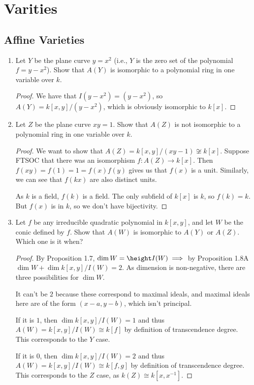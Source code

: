 \section{Varities}

\subsection{Affine Varieties}

\begin{exercise}%
\begin{enumerate}
\item Let $Y $ be the plane curve $y = x^2 $ (i.e., $Y $ is the zero set of the polynomial $f = y - x^2 $). Show that $A(Y) $ is isomorphic to a polynomial ring in one variable over $k $.
\begin{proof}
	We have that $I(y-x^2) = (y-x^2) $, so $A(Y) = k[x,y] / (y-x^2) $, which is obviously isomorphic to $k[x] $.
\end{proof}
\item Let $Z $ be the plane curve $xy = 1 $. Show that $A(Z) $ is not isomorphic to a polynomial ring in one variable over $k $.
\begin{proof}
	We want to show that $A(Z) = k[x,y] / (xy-1) \not\cong k[x] $.
	Suppose FTSOC that there was an isomorphism $f: A(Z) \to k[x]$.
	Then $f(xy) = f(1) = 1 = f(x)f(y) $ gives us that $f(x) $ is a unit.
	Similarly, we can see that $f(kx) $ are also distinct units.

	As $k $ is a field, $f(k) $ is a field.
	The only subfield of $k[x] $ is $k $, so $f(k) = k $.
	But $f(x) $ is in $k $, so we don't have bijectivity.
\end{proof}
\item Let $f $ be any irreducible quadratic polynomial in $k[x,y] $, and let $W $ be the conic defined by $f $. Show that $A(W) $ is isomorphic to $A(Y) $ or $A(Z) $. Which one is it when?
\begin{proof}
	By Proposition 1.7, $\dim W = \height I(W) \implies $ by Proposition 1.8A $\dim W + \dim k[x,y] / I(W) = 2 $.
	As dimension is non-negative, there are three possibilities for $\dim W $.

	It can't be $2 $ because these correspond to maximal ideals, and maximal ideals here are of the form $(x-a,y-b) $, which isn't principal.

	If it is $1 $, then $\dim k[x,y] / I(W) = 1 $ and thus $A(W) = k[x,y] / I(W) \cong k[f] $ by definition of transcendence degree.
	This corresponds to the $Y $ case.

	If it is $0 $, then $\dim k[x,y] / I(W) = 2 $ and thus $A(W) = k[x,y] / I(W) \cong k[f,g] $ by definition of transcendence degree.
	This corresponds to the $Z $ case, as $k(Z) \cong k[x,x^{-1}] $.
\end{proof}
\end{enumerate}
\end{exercise}

